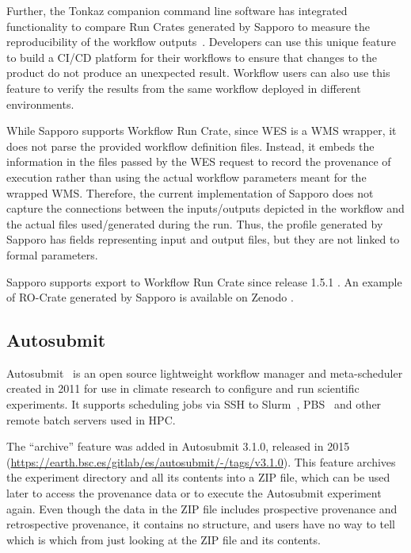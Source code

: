 \documentclass[10pt,letterpaper]{article}
\begin{document}
Further, the Tonkaz companion command line software has integrated functionality to compare Run Crates generated by Sapporo to measure the reproducibility of the workflow outputs~\cite{Suetake 2023}.
Developers can use this unique feature to build a CI/CD platform for their workflows to ensure that changes to the product do not produce an unexpected result.
Workflow users can also use this feature to verify the results from the same workflow deployed in different environments.

While Sapporo supports Workflow Run Crate, since WES is a WMS wrapper, it does not parse the provided workflow definition files. 
Instead, it embeds the information in the files passed by the WES request to record the provenance of execution rather than using the actual workflow parameters meant for the wrapped WMS.
Therefore, the current implementation of Sapporo does not capture the connections between the inputs/outputs depicted in the workflow and the actual files used/generated during the run.
Thus, the profile generated by Sapporo has fields representing input and output files, but they are not linked to formal parameters.

Sapporo supports export to Workflow Run Crate since release 1.5.1 \cite{Suetake 2023b}. An example of RO-Crate generated by Sapporo is available on Zenodo \cite{Ohta 2023}.

\subsection{Autosubmit}\label{autosubmit}

Autosubmit~\cite{Manubens-Gil 2016} is an open source lightweight workflow manager and meta-scheduler created in 2011 for use in climate research to configure and run scientific experiments.
It supports scheduling jobs via SSH to Slurm~\cite{Yoo 2003}, PBS~\cite{Feng 2007} and other remote batch servers used in HPC.

The ``archive'' feature was added in Autosubmit 3.1.0, released in 2015 (\url{https://earth.bsc.es/gitlab/es/autosubmit/-/tags/v3.1.0}).
This feature archives the experiment directory and all its contents into a ZIP file, which can be used later to access the provenance data or to execute the Autosubmit experiment again.
Even though the data in the ZIP file includes prospective provenance and retrospective provenance, it contains no structure, and users have no way to tell which is which from just looking at the ZIP file and its contents.
\end{document}
